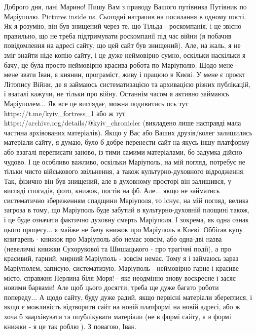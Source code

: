  
 
 
 
 

Доброго дня, пані Марино! Пишу Вам з приводу Вашого путівника Путівник по
Маріуполю. Pictures inside us. Сьогодні натрапив на посилання в одному пості.
Як я розумію, він був знищений через те, що Тільда - роскомпанія, і це звісно
правильно, що не треба підтримувати роскомпанії під час війни (я побачив
повідомлення на адресі сайту, що цей сайт був знищений). Але, на жаль, я не
зміг знайти ніде копію сайту, і це дуже неймовірно сумно, оскільки наскільки я
бачу, це була просто неймовірно красива робота по Маріуполю. Щодо мене - мене
звати Іван, я киянин, програміст, живу і працюю в Києві. У мене є проєкт
Літопису Війни, де я займаюсь систематизацією та архивацією різних публікацій,
і взагалі кажучи, не тільки про війну. Останнім часом я активно займаюсь
Маріуполем... Як все це виглядає, можна подивитись ось тут
https://t.me/kyiv_fortress_1 або ж тут
https://archive.org/details/@kyiv_chronicler (викладено лише насправді мала
частина архівованих матеріалів). Якщо у Вас або Ваших друзів/колег залишились
матеріали сайту, я думаю, було б добре перенести сайт на якусь іншу платформу
або взагалі переписати заново, із тими самими матеріалами, бо задумка дійсно
чудово. І це особливо важливо, оскільки Маріуполь, на мій погляд, потребує не
тільки чисто військового звільнення, а також культурно-духовного відродження.
Так, фізично він був знищений, але в духовному просторі він залишився, у
вигляді спогадів, фото, книжок, постів на фб. Але... якщо не займатись
систематично збереженням спадщини Маріуполя, то існує, на мій погляд, велика
загроза в тому, що Маріуполь буде забутий в культурно-духовній площині також, і
це буде означати фактично духовну смерть Маріуполя. І зокрема, як одна ознак
цього процесу... я майже не бачу книжок про Маріуполь в Києві. Оббігав купу
книгарень - книжок про Маріуполь або немає зовсім, або одна-дві назва
(невеличкі книжки Сухорукової та Шишацького - про трагічні події), а про
красивий, гарний, мирний Маріуполь - зовсім немає. Тому я і займаюсь зараз
Маріуполем, записую, систематизую. Маріуполь - неймовірно гарне і красиве
місто, справжня Перлина біля Моря! - яке неодмінно знову воскресне і засяє
новими барвами! Але щоб цього досягти, треба ще дуже багато роботи попереду...
А щодо сайту, буду дуже радий, якщо первісні матеріали збереглися, і якщо є
можливість відтворити сайт на новій платформі на новій адресі, або ж хоча б
заархівувати та опублікувати матеріали (не в формі сайту, а в формі книжки - я
це так роблю ). З повагою, Іван.

